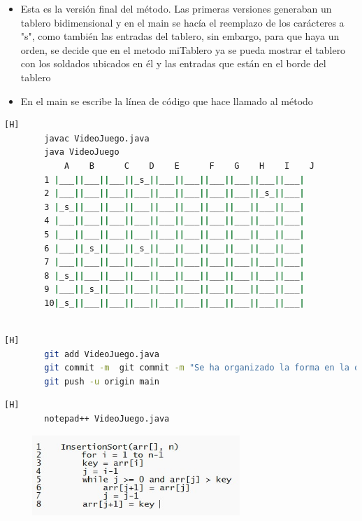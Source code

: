 \documentclass{article}
\begin{document}
	\begin{itemize}	
			\item Esta es la versión final del método. Las primeras versiones generaban un tablero bidimensional y en el main se hacía el reemplazo de los carácteres a "s", como también las entradas del tablero, sin embargo, para que haya un orden, se decide que en el metodo miTablero ya se pueda mostrar el tablero con los soldados ubicados en él y las entradas que están en el borde del tablero
			\item En el main se escribe la línea de código que hace llamado al método
	\end{itemize}
	
	\begin{lstlisting}[language=bash,caption={ Probando el tablero  }][H]
		javac VideoJuego.java
		java VideoJuego
		    A    B      C    D    E      F    G    H    I    J
		1 |___||___||___||_s_||___||___||___||___||___||___|
		2 |___||___||___||___||___||___||___||___||_s_||___|
		3 |_s_||___||___||___||___||___||___||___||___||___|
		4 |___||___||___||___||___||___||___||___||___||___|
		5 |___||___||___||___||___||___||___||___||___||___|
		6 |___||_s_||___||_s_||___||___||___||___||___||___|
		7 |___||___||___||___||___||___||___||___||___||___|
		8 |_s_||___||___||___||___||___||___||___||___||___|
		9 |___||_s_||___||___||___||___||___||___||___||___|
		10|_s_||___||___||___||___||___||___||___||___||___|
		
	\end{lstlisting}
	
	
	\begin{lstlisting}[language=bash,caption={Commit:  Se ha organizado la forma en la que se muestra el tablero, ahora está en un método }][H]
		git add VideoJuego.java
		git commit -m  git commit -m "Se ha organizado la forma en la que se muestra el tablero, ahora esta en un metodo"
		git push -u origin main
	\end{lstlisting}	
		
		
	\begin{lstlisting}[language=bash,caption={Método de ordenamiento por inserción y también la impresión de los datos de acuerdo a su orden de creación}][H]
		notepad++ VideoJuego.java
	\end{lstlisting}	
		
	

	\begin{figure}[H]
		\centering
		\includegraphics[width=0.7\textwidth,keepaspectratio]{img/insertion.jpg}
	\end{figure}	
	
\end{document}
